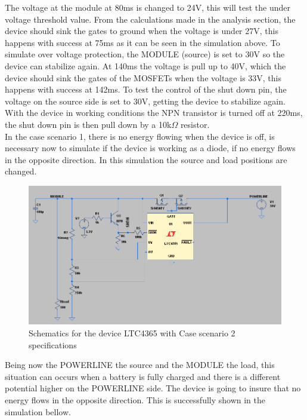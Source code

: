 The voltage at the module at 80ms is changed to 24V, this will test the under voltage threshold value. From the calculations made in the analysis section, the device should sink the gates to ground when the voltage is under 27V, this happens with success at 75ms as it can be seen in the simulation above.
To simulate over voltage protection, the MODULE (source) is set to 30V so the device can stabilize again. At 140ms the voltage is pull up to 40V, which the device should sink the gates of the MOSFETs when the voltage is 33V, this happens with success at 142ms.
To test the control of the shut down pin, the voltage on the source side is set to 30V, getting the device to stabilize again. With the device in working conditions the NPN transistor is turned off at 220ms, the shut down pin is then pull down by a 10k$ \Omega $ resistor.\\
%
In the case scenario 1, there is no energy flowing when the device is off, is necessary now to simulate if the device is working as a diode, if no energy flows in the opposite direction. In this simulation the source and load positions are changed.
\begin{figure}[H]
	\begin{centering}
		\includegraphics[width=1\textwidth]{images/tb5_LTC_simu2sc.png}
		\caption{Schematics for the device LTC4365 with Case scenario 2 specifications}
	\end{centering}
\end{figure}
%
Being now the POWERLINE the source and the MODULE the load, this situation can occurs when a battery is fully charged and there is a different potential higher on the POWERLINE side. The device is going to insure that no energy flows in the opposite direction. This is successfully shown in the simulation bellow.
